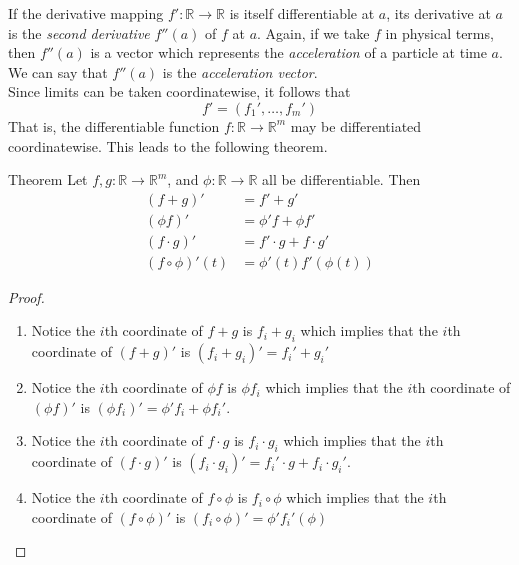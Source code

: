If the derivative mapping \( f':\mathbb{R} \rightarrow \mathbb{R} \) is itself differentiable at \( a \), its derivative at \( a \) is the \emph{second derivative} \( f''(a) \) of \( f \) at \( a \). Again, if we take \( f \) in physical terms, then \( f''(a) \) is a vector which represents the \emph{acceleration} of a particle at time \( a \). We can say that \( f''(a) \) is the \emph{acceleration vector}.
\\

Since limits can be taken coordinatewise, it follows that
\[
f'=(f_1',\ldots,f_m')
\]
That is, the differentiable function \( f: \mathbb{R} \rightarrow \mathbb{R}^m \) may be differentiated coordinatewise. This leads to the following theorem.

\begin{thm}{Theorem}
Let \( f,g: \mathbb{R} \rightarrow \mathbb{R}^m \), and \( \phi: \mathbb{R} \rightarrow \mathbb{R} \) all be differentiable. Then
\begin{align*}
    (f+g)' &= f'+g' \\
    (\phi f)' &= \phi' f + \phi f' \\
    (f \cdot g)' &= f'\cdot g + f \cdot g' \\
    (f \circ \phi)'(t) &= \phi'(t)f'(\phi(t))
\end{align*}
\end{thm}
\begin{proof}
\begin{enumerate}
    \item Notice the \(i\)th coordinate of \( f+g \) is \( f_i+g_i \) which implies that the \(i\)th coordinate of \( (f+g)' \) is \( (f_i+g_i)' = f_i'+g_i' \) 
    \item Notice the \(i\)th coordinate of \( \phi f \) is \( \phi f_i \) which implies that the \(i\)th coordinate of \( (\phi f)' \) is \( (\phi f_i)' =  \phi' f_i + \phi f_i' \).
    
    \item Notice the \(i\)th coordinate of \( f\cdot g \) is \( f_i\cdot g_i \) which implies that the \(i\)th coordinate of \( (f \cdot g)' \) is \( (f_i \cdot g_i)' = f_i'\cdot g + f_i \cdot g_i' \).
    
    \item Notice the \(i\)th coordinate of \( f \circ \phi \) is \( f_i \circ \phi \) which implies that the \(i\)th coordinate of \( (f \circ \phi)' \) is \( (f_i \circ\phi)' = \phi'f_i'(\phi) \)
\end{enumerate}
\end{proof}

